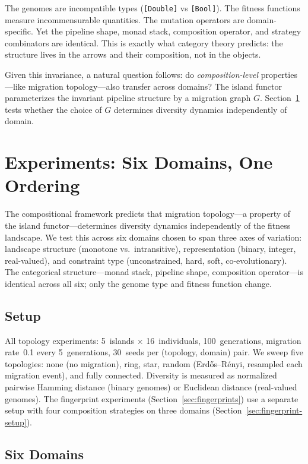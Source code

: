 \documentclass[dvipsnames,format=sigconf,anonymous=true,review=false]{acmart}
\begin{document}
The genomes are incompatible types (\texttt{[Double]} vs \texttt{[Bool]}). The fitness functions measure incommensurable quantities. The mutation operators are domain-specific. Yet the pipeline shape, monad stack, composition operator, and strategy combinators are identical. This is exactly what category theory predicts: the structure lives in the arrows and their composition, not in the objects.

Given this invariance, a natural question follows: do \emph{composition-level} properties---like migration topology---also transfer across domains? The island functor parameterizes the invariant pipeline structure by a migration graph $G$. Section~\ref{sec:experiments} tests whether the choice of $G$ determines diversity dynamics independently of domain.


\section{Experiments: Six Domains, One Ordering}
\label{sec:experiments}

The compositional framework predicts that migration topology---a property of the island functor---determines diversity dynamics independently of the fitness landscape. We test this across six domains chosen to span three axes of variation: landscape structure (monotone vs.\ intransitive), representation (binary, integer, real-valued), and constraint type (unconstrained, hard, soft, co-evolutionary). The categorical structure---monad stack, pipeline shape, composition operator---is identical across all six; only the genome type and fitness function change.

\subsection{Setup}

All topology experiments: 5~islands $\times$ 16~individuals, 100~generations, migration rate~0.1 every 5~generations, 30~seeds per (topology, domain) pair. We sweep five topologies: none (no migration), ring, star, random (Erd\H{o}s--R\'{e}nyi, resampled each migration event), and fully connected. Diversity is measured as normalized pairwise Hamming distance (binary genomes) or Euclidean distance (real-valued genomes). The fingerprint experiments (Section~\ref{sec:fingerprints}) use a separate setup with four composition strategies on three domains (Section~\ref{sec:fingerprint-setup}).

\subsection{Six Domains}
\end{document}
